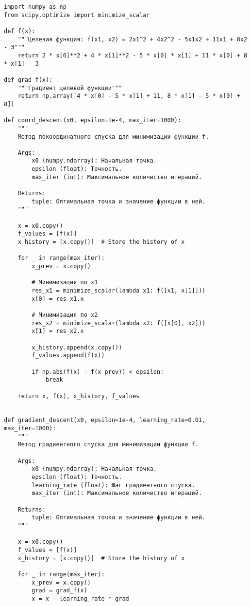 \documentclass{article}
\begin{document}
\begin{lstlisting}
import numpy as np
from scipy.optimize import minimize_scalar

def f(x):
    """Целевая функция: f(x1, x2) = 2x1^2 + 4x2^2 - 5x1x2 + 11x1 + 8x2 - 3"""
    return 2 * x[0]**2 + 4 * x[1]**2 - 5 * x[0] * x[1] + 11 * x[0] + 8 * x[1] - 3

def grad_f(x):
    """Градиент целевой функции"""
    return np.array([4 * x[0] - 5 * x[1] + 11, 8 * x[1] - 5 * x[0] + 8])

def coord_descent(x0, epsilon=1e-4, max_iter=1000):
    """
    Метод покоординатного спуска для минимизации функции f.

    Args:
        x0 (numpy.ndarray): Начальная точка.
        epsilon (float): Точность.
        max_iter (int): Максимальное количество итераций.

    Returns:
        tuple: Оптимальная точка и значение функции в ней.
    """

    x = x0.copy()
    f_values = [f(x)]
    x_history = [x.copy()]  # Store the history of x

    for _ in range(max_iter):
        x_prev = x.copy()

        # Минимизация по x1
        res_x1 = minimize_scalar(lambda x1: f([x1, x[1]]))
        x[0] = res_x1.x

        # Минимизация по x2
        res_x2 = minimize_scalar(lambda x2: f([x[0], x2]))
        x[1] = res_x2.x

        x_history.append(x.copy())
        f_values.append(f(x))

        if np.abs(f(x) - f(x_prev)) < epsilon:
            break

    return x, f(x), x_history, f_values


def gradient_descent(x0, epsilon=1e-4, learning_rate=0.01, max_iter=1000):
    """
    Метод градиентного спуска для минимизации функции f.

    Args:
        x0 (numpy.ndarray): Начальная точка.
        epsilon (float): Точность.
        learning_rate (float): Шаг градиентного спуска.
        max_iter (int): Максимальное количество итераций.

    Returns:
        tuple: Оптимальная точка и значение функции в ней.
    """

    x = x0.copy()
    f_values = [f(x)]
    x_history = [x.copy()]  # Store the history of x
    
    for _ in range(max_iter):
        x_prev = x.copy()
        grad = grad_f(x)
        x = x - learning_rate * grad


\end{lstlisting}
\end{document}
